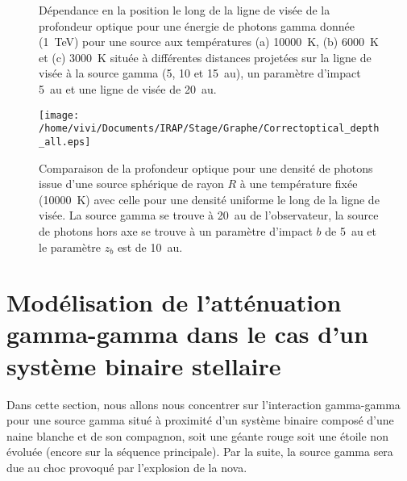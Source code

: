\documentclass[a4paper,12pt,twoside]{article}
\begin{document}
\begin{figure}
	\centering
    \hfill
    \hfill
    \hfill
    \caption{Dépendance en la position le long de la ligne de visée de la profondeur optique pour une énergie de photons gamma donnée (\SI{1}{\TeV}) pour une source aux températures (a) \SI{10000}{\K}, (b) \SI{6000}{\K} et (c) \SI{3000}{\K} située à différentes distances projetées sur la ligne de visée à la source gamma (5, 10 et \SI{15}{\astronomicalunit}), un paramètre d'impact \SI{5}{\astronomicalunit} et une ligne de visée de \SI{20}{\astronomicalunit}.}
    \label{fig: optical depth zb}
\end{figure}

\begin{figure}
	\centering
    \texttt{[image: /home/vivi/Documents/IRAP/Stage/Graphe/Correctoptical\_depth\_all.eps]}
    \caption{Comparaison de la profondeur optique pour une densité de photons issue d'une source sphérique de rayon $R$ à une température fixée (\SI{10000}{\K}) avec celle pour une densité uniforme le long de la ligne de visée. La source gamma se trouve à \SI{20}{\astronomicalunit} de l'observateur, la source de photons hors axe se trouve à un paramètre d'impact $b$ de \SI{5}{\astronomicalunit} et le paramètre $z_b$ est de \SI{10}{\astronomicalunit}.}
    \label{fig: optical depth compare}
\end{figure}
\newpage

\section{Modélisation de l'atténuation gamma-gamma dans le cas d'un système binaire stellaire}

Dans cette section, nous allons nous concentrer sur l'interaction gamma-gamma pour une source gamma situé à proximité d'un système binaire composé d'une naine blanche et de son compagnon, soit une géante rouge soit une étoile non évoluée (encore sur la séquence principale). Par la suite, la source gamma sera due au choc provoqué par l'explosion de la nova.
\end{document}
